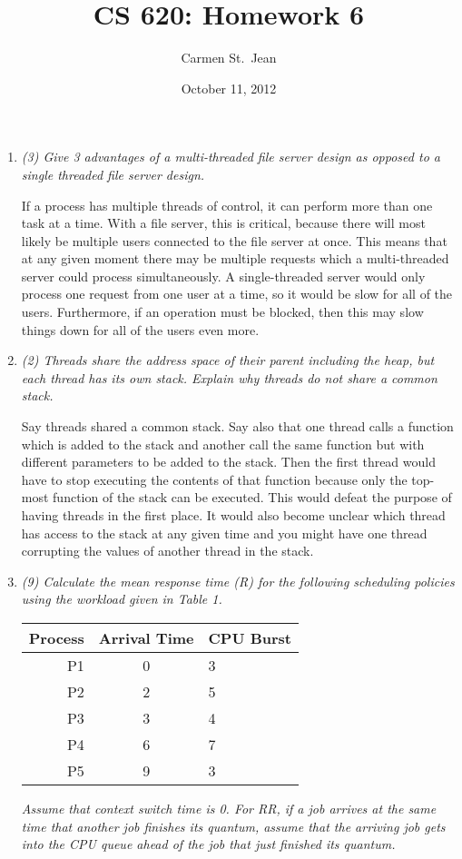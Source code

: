 \documentclass[letterpaper,11pt]{article}
\begin{document}
\title{CS 620: Homework 6}
\date{October 11, 2012}
\author{Carmen St.\ Jean}

\maketitle

\begin{enumerate}
\item \emph{(3) Give 3 advantages of a multi-threaded file server design as opposed to a single threaded file server design.}

If a process has multiple threads of control, it can perform more than one task at a time.  With a file server, this is critical, because there will most likely be multiple users connected to the file server at once.  This means that at any given moment there may be multiple requests which a multi-threaded server could process simultaneously.  A single-threaded server would only process one request from one user at a time, so it would be slow for all of the users.  Furthermore, if an operation must be blocked, then this may slow things down for all of the users even more.
\item \emph{(2) Threads share the address space of their parent including the heap, but each thread has its own stack. Explain why threads do not share a common stack.}

Say threads shared a common stack.  Say also that one thread calls a function which is added to the stack and another call the same function but with different parameters to be added to the stack.  Then the first thread would have to stop executing the contents of that function because only the top-most function of the stack can be executed.  This would defeat the purpose of having threads in the first place.  It would also become unclear which thread has access to the stack at any given time and you might have one thread corrupting the values of another thread in the stack.
\item \emph{(9) Calculate the mean response time (R) for the following scheduling policies using the workload given in Table 1.}
\begin{center}
  \begin{tabular}{r | c | l }
    Process & Arrival Time & CPU Burst \\ \hline
    \hline
    P1      & 0            & 3 \\ \hline
    P2      & 2            & 5 \\ \hline
    P3      & 3            & 4 \\ \hline
    P4      & 6            & 7 \\ \hline
    P5      & 9            & 3 \\ \hline
    \hline
  \end{tabular}
\end{center}
\emph{Assume that context switch time is 0. For RR, if a job arrives at the same time that another job finishes its quantum, assume that the arriving job gets into the CPU queue ahead of the job that just finished its quantum.}


\end{enumerate}
\end{document}
